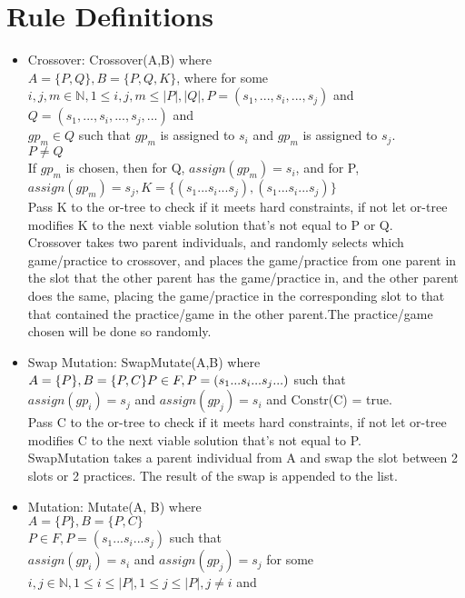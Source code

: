 \documentclass[12 pt]{article}        	%
\begin{document}
\section{Rule Definitions}
\begin{itemize}
    \item Crossover: Crossover(A,B) where
    \\$A= \{P, Q\}, B = \{P, Q, K\}$, where for some $i, j, m \in \mathbb{N}, 1\le i, j, m \le |P|, |Q|, P = (s_1, ..., s_i, ..., s_j)$ and
    \\ $Q = (s_1, ..., s_i, ..., s_j, ...)$ and
    \\ $gp_m \in Q$ such that $gp_m$ is assigned to $s_i$ and $gp_m$ is assigned to $s_j$. 
    \\ $P \neq Q$
    \\ If $gp_m$ is chosen, then for Q, $assign(gp_m) = s_i$, and for P, $assign(gp_m) = s_j, K = \{(s_1 ... s_i ... s_j), (s_1 ... s_i ... s_j)\}$
    \\Pass K to the or-tree to check if it meets hard constraints, if not let or-tree modifies K to the next
viable solution that’s not equal to P or Q.
    \\Crossover takes two parent individuals, and randomly selects which game/practice to crossover, and
places the game/practice from one parent in the slot that the other parent has the game/practice
in, and the other parent does the same, placing the game/practice in the corresponding slot to that
that contained the practice/game in the other parent.The practice/game chosen will be done so
randomly.
    \item Swap Mutation: SwapMutate(A,B) where
    \\ $A = \{P\}, B = \{P, C\}
    \\ P \in F, P = (s_1 ... s_i ... s_j ...)$ such that
    \\ $assign(gp_i) = s_j$ and $assign(gp_j) = s_i$ and Constr(C) = true.
    \\ Pass C to the or-tree to check if it meets hard constraints, if not let or-tree modifies C to the next
viable solution that’s not equal to P.
    \\ SwapMutation takes a parent individual from A and swap the slot between 2 slots
or 2 practices. The result of the swap is appended to the list.
\item Mutation: Mutate(A, B) where
\\ $A = \{P\}, B = \{P,C\}$
\\ $P \in F, P = (s_1 ... s_i ... s_j)$ such that
\\ $assign(gp_i) = s_i $ and $assign(gp_j) = s_j$ for some $i, j \in \mathbb{N}, 1 \le i \le |P|, 1 \le j \le |P|, j \neq i$ and

\end{itemize}
\end{document}
